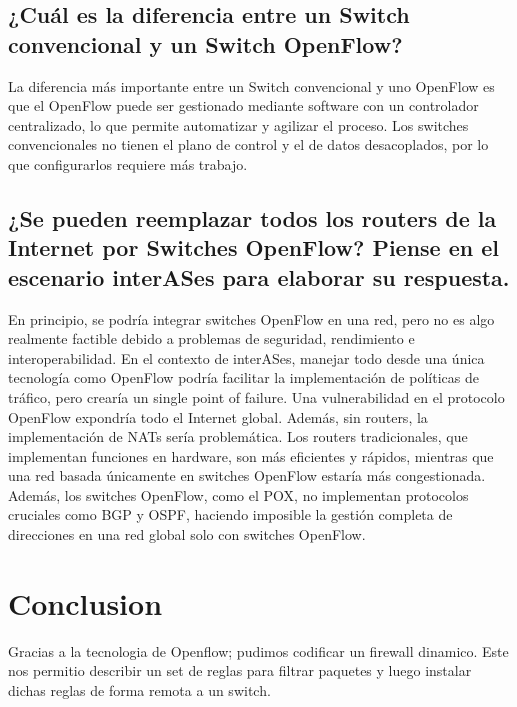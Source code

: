 \documentclass{article}
\begin{document}
\subsection{¿Cuál es la diferencia entre un Switch convencional y un Switch OpenFlow?}
La diferencia más importante entre un Switch convencional y uno OpenFlow es que el OpenFlow puede ser gestionado mediante software con un controlador centralizado, lo que permite automatizar y agilizar el proceso. Los switches convencionales no tienen el plano de control y el de datos desacoplados, por lo que configurarlos requiere más trabajo.


\subsection{¿Se pueden reemplazar todos los routers de la Internet por Switches OpenFlow? Piense en el escenario interASes para elaborar su respuesta.}
En principio, se podría integrar switches OpenFlow en una red, pero no es algo realmente factible debido a problemas de seguridad, rendimiento e interoperabilidad. En el contexto de interASes, manejar todo desde una única tecnología como OpenFlow podría facilitar la implementación de políticas de tráfico, pero crearía un single point of failure. Una vulnerabilidad en el protocolo OpenFlow expondría todo el Internet global. Además, sin routers, la implementación de NATs sería problemática. Los routers tradicionales, que implementan funciones en hardware, son más eficientes y rápidos, mientras que una red basada únicamente en switches OpenFlow estaría más congestionada. Además, los switches OpenFlow, como el POX, no implementan protocolos cruciales como BGP y OSPF, haciendo imposible la gestión completa de direcciones en una red global solo con switches OpenFlow.


\section{Conclusion}
Gracias a la tecnologia de Openflow; pudimos codificar un firewall dinamico. Este nos permitio describir un set de reglas para filtrar paquetes y luego instalar dichas reglas de forma remota a un switch.
\end{document}
